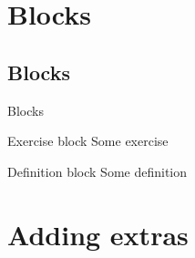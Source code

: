 \documentclass[aspectratio=43,11pt]{beamer}
\begin{document}
%
%
%
%

\section{Blocks}
\subsection{Blocks}
\begin{frame}{Blocks}
  \begin{exampleblock}{Exercise block}
    Some exercise
  \end{exampleblock}
  \begin{block}{Definition block}
    Some definition
  \end{block}
\end{frame}

\section{Adding extras}
\end{document}
